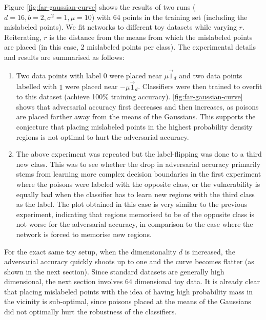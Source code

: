 \documentclass{ociamthesis}
\begin{document}
Figure \ref{fig:far-gaussian-curve} shows the results of two runs ($d=16, b=2,
\sigma^2=1, \mu=10$) with 64 points in the training set (including the
mislabeled points). We fit networks to different toy datasets while varying $r$.
Reiterating, $r$ is the distance from the means from which the mislabeled points
are placed (in this case, 2 mislabeled points per class). The experimental
details and results are summarised as follows:

\begin{enumerate}
    \item Two data points with label $0$ were placed near $\mu\vec{1}_d$ and two
    data points labelled with $1$ were placed near $-\mu\vec{1}_d$. Classifiers
    were then trained to overfit to this dataset (achieve 100\% training
    accuracy). \cref{fig:far-gaussian-curve} shows that adversarial accuracy
    first decreases and then increases, as poisons are placed farther away from
    the means of the Gaussians. This supports the conjecture that placing
    mislabeled points in the highest probability density regions is not optimal
    to hurt the adversarial accuracy.
    \item The above experiment was repeated but the label-flipping was done to a
    third new class. This was to see whether the drop in adversarial accuracy
    primarily stems from learning more complex decision boundaries in the first
    experiment where the poisons were labeled with the opposite class, or the
    vulnerability is equally bad when the classifier has to learn new regions
    with the third class as the label. The plot obtained in this case is very
    similar to the previous experiment, indicating that regions memorised to be
    of the opposite class is not worse for the adversarial accuracy, in
    comparison to the case where the network is forced to memorise new regions.
\end{enumerate}

For the exact same toy setup, when the dimensionality $d$ is increased, the
adversarial accuracy quickly shoots up to one and the curve becomes flatter (as
shown in the next section). Since standard datasets are generally high
dimensional, the next section involves 64 dimensional toy data. It is already
clear that placing mislabeled points with the idea of having high probability
mass in the vicinity is sub-optimal, since poisons placed at the means of the
Gaussians did not optimally hurt the robustness of the classifiers.
\end{document}
